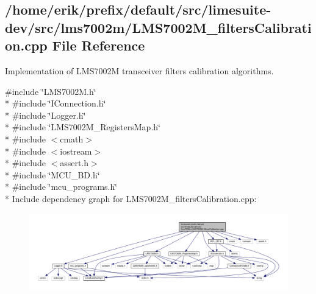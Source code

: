 \subsection{/home/erik/prefix/default/src/limesuite-\/dev/src/lms7002m/\+L\+M\+S7002\+M\+\_\+filters\+Calibration.cpp File Reference}
\label{LMS7002M__filtersCalibration_8cpp}


Implementation of L\+M\+S7002M transceiver filters calibration algorithms.  


{\ttfamily \#include \char`\"{}L\+M\+S7002\+M.\+h\char`\"{}}\\*
{\ttfamily \#include \char`\"{}I\+Connection.\+h\char`\"{}}\\*
{\ttfamily \#include \char`\"{}Logger.\+h\char`\"{}}\\*
{\ttfamily \#include \char`\"{}L\+M\+S7002\+M\+\_\+\+Registers\+Map.\+h\char`\"{}}\\*
{\ttfamily \#include $<$cmath$>$}\\*
{\ttfamily \#include $<$iostream$>$}\\*
{\ttfamily \#include $<$assert.\+h$>$}\\*
{\ttfamily \#include \char`\"{}M\+C\+U\+\_\+\+B\+D.\+h\char`\"{}}\\*
{\ttfamily \#include \char`\"{}mcu\+\_\+programs.\+h\char`\"{}}\\*
Include dependency graph for L\+M\+S7002\+M\+\_\+filters\+Calibration.\+cpp\+:
\nopagebreak
\begin{figure}[H]
\begin{center}
\leavevmode
\includegraphics[width=350pt]{d2/dda/LMS7002M__filtersCalibration_8cpp__incl}
\end{center}
\end{figure}
